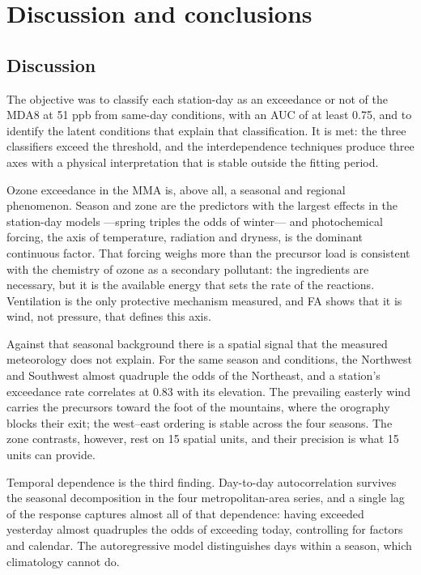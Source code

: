 \section{Discussion and conclusions}
\label{sec:conclusiones}

\subsection{Discussion}

The objective was to classify each station-day as an exceedance or not of
the MDA8 at 51 ppb from same-day conditions, with an AUC of at least 0.75,
and to identify the latent conditions that explain that classification. It
is met: the three classifiers exceed the threshold, and the interdependence
techniques produce three axes with a physical interpretation that is stable
outside the fitting period.

Ozone exceedance in the MMA is, above all, a seasonal and regional
phenomenon. Season and zone are the predictors with the largest effects in
the station-day models ---spring triples the odds of winter--- and
photochemical forcing, the axis of temperature, radiation and dryness, is the
dominant continuous factor. That forcing weighs more than the precursor load
is consistent with the chemistry of ozone as a secondary pollutant: the
ingredients are necessary, but it is the available energy that sets the rate
of the reactions. Ventilation is the only protective mechanism measured, and
FA shows that it is wind, not pressure, that defines this axis.

Against that seasonal background there is a spatial signal that the measured
meteorology does not explain. For the same season and conditions, the
Northwest and Southwest almost quadruple the odds of the Northeast, and a
station's exceedance rate correlates at 0.83 with its elevation. The
prevailing easterly wind carries the precursors toward the foot of the
mountains, where the orography blocks their exit; the west--east ordering is
stable across the four seasons. The zone contrasts, however, rest on 15
spatial units, and their precision is what 15 units can provide.

Temporal dependence is the third finding. Day-to-day autocorrelation survives
the seasonal decomposition in the four metropolitan-area series, and a single
lag of the response captures almost all of that dependence: having exceeded
yesterday almost quadruples the odds of exceeding today, controlling for
factors and calendar. The autoregressive model distinguishes days within a
season, which climatology cannot do.

